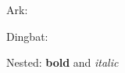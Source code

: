 \documentclass{article}
\begin{document}
Ark: \carriagereturn\ \leftthumbsdown\ \eye\ \rightpointleft\ \smallpencil\ \leftpointright\
\leftthumbsup\ \largepencil\ \rightthumbsdown\ \rightthumbsup

Dingbat: \checkmark\ \satellitedish\ \rightpointright\ \anchor\ \squarewithdots\
\filledsquarewithdots\ \Sborder\ \Zborder

Nested: \textbf{bold \checkmark} and \emph{italic \anchor}
\end{document}
